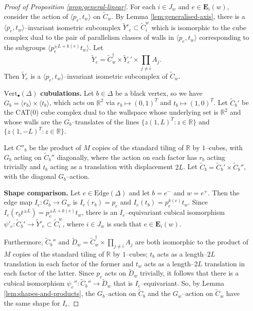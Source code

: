\documentclass[11pt,oneside]{amsart}
\newcounter{ax}
\theoremstyle{definition}
\newcommand{\field}[1]{\mathbb{#1}}
\newcommand{\reals}{\ensuremath{\field{R}}}
\newcommand{\vertices}{\mathrm{Vert}}
\newcommand{\edges}{\mathrm{Edge}}
\begin{document}
\begin{proof}[Proof of Proposition \ref{prop:general-linear}]
For each $i\in J_w$ and $e\in\mathbf E_i(w)$, consider the action of $\langle p_e,t_w\rangle$ on $\widetilde C_w$.  By Lemma \ref{lem:generalised-axis}, there is a $\langle p_e,t_w\rangle$--invariant isometric subcomplex $\widetilde Y'_e\subset \widetilde C_i^w$ which is isomorphic to the cube complex dual to the pair of parallelism classes of walls in $\langle p_e,t_w\rangle$ corresponding to the subgroups $\langle p_e^{\pm L+k(e)}t_w\rangle$.  Let 
$$\widetilde Y_e=\widetilde C^\dagger_w\times \widetilde Y_e'\times \prod_{j\neq i}A_j.$$
Then $\widetilde Y_e$ is a $\langle p_e,t_w\rangle$--invariant isometric subcomplex of $\widetilde C_w$.

\textbf{$\vertices_\bullet(\Delta)$ cubulations.}  Let $b\in\Delta$ be a black vertex, so we have $G_b=\langle r_b\rangle\times \langle t_b\rangle$, which acts on $\reals^2$ via $r_b\mapsto (0,1)^T$ and $t_b\mapsto (1,0)^T$.  Let $\widetilde C_b'$ be the CAT(0) cube complex dual to the wallspace whose underlying set is $\reals^2$ and whose walls are the $G_b$--translates of the lines $\{z(1, L)^T:z\in\reals\}$ and $\{z(1, -L)^T:z\in\reals\}$.

Let $C''_b$ be the product of $M$ copies of the standard tiling of $\reals$ by $1$--cubes, with $G_b$ acting on $\widetilde C_b''$ diagonally, where the action on each factor has $r_b$ acting trivially and $t_b$ acting as a translation with displacement $2L$.  Let $\widetilde C_b=\widetilde C_b'\times\widetilde C_b''$, with the diagonal $G_b$--action.

\textbf{Shape comparison.}  Let $e\in\edges(\Delta)$ and let $b=e^-$ and $w=e^+$.  Then the edge map $I_e:G_b\to G_w$ is $I_e(r_b)=p_e$ and $I_e(t_b)=p_e^{k(e)}t_w$.  Since $I_e(r_bt^{\pm L})=p_e^{\pm L+k(e)}t_w$, there is an $I_e$--equivariant cubical isomorphism $\psi'_e:\widetilde C_b'\to \widetilde Y'_e\subset \widetilde C_i^w$, where $i\in J_w$ is such that $e\in\mathbf E_i(w)$.

Furthermore, $\widetilde C_b''$ and $\widetilde D_w=\widetilde C_w^\dagger\times \prod_{j\neq i}A_j$ are both isomorphic to the product of $M$ copies of the standard tiling of $\reals$ by $1$--cubes; $t_b$ acts as a length--$2L$ translation in each factor of the former and $t_w$ acts as a length--$2L$ translation in each factor of the latter.  Since $p_e$ acts on $\widetilde D_w$ trivially, it follows that there is a cubical isomorphism $\psi_e'':\widetilde C_b''\to\widetilde D_w$ that is $I_e$--equivariant.  So, by Lemma \ref{lem:shapes-and-products}, the $G_b$--action on $\widetilde C_b$ and the $G_w$--action on $\widetilde C_w$ have the same shape for $I_e$. 


\end{proof}
\end{document}
